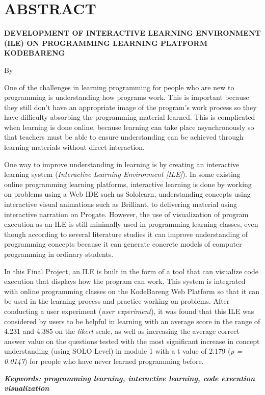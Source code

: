\clearpage
\chapter*{ABSTRACT}

\begin{center}
  \center
  \begin{singlespace}
    \bfseries \MakeUppercase{Development of Interactive Learning Environment (ILE) on Programming Learning Platform KodeBareng}

    \normalfont\normalsize
    By

    \bfseries \theauthor
  \end{singlespace}
\end{center}


\begin{singlespace}
  One of the challenges in learning programming for people who are new to programming is understanding how programs work. This is important because they still don't have an appropriate image of the program's work process so they have difficulty absorbing the programming material learned. This is complicated when learning is done online, because learning can take place asynchronously so that teachers must be able to ensure understanding can be achieved through learning materials without direct interaction.

  One way to improve understanding in learning is by creating an interactive learning system (\textit{Interactive Learning Environment [ILE]}). In some existing online programming learning platforms, interactive learning is done by working on problems using a Web IDE such as Sololearn, understanding concepts using interactive visual animations such as Brilliant, to delivering material using interactive narration on Progate. However, the use of visualization of program execution as an ILE is still minimally used in programming learning classes, even though according to several literature studies it can improve understanding of programming concepts because it can generate concrete models of computer programming in ordinary students.

  In this Final Project, an ILE is built in the form of a tool that can visualize code execution that displays how the program can work. This system is integrated with online programming classes on the KodeBareng Web Platform so that it can be used in the learning process and practice working on problems. After conducting a user experiment (\textit{user experiment}), it was found that this ILE was considered by users to be helpful in learning with an average score in the range of 4.231 and 4.385 on the \textit{likert} scale, as well as increasing the average correct answer value on the questions tested with the most significant increase in concept understanding (using SOLO Level) in module 1 with a t value of 2.179 (\textit{p = 0.0147}) for people who have never learned programming before.

  \textbf{\textit{Keywords: programming learning, interactive learning, code execution visualization}}
\end{singlespace}
\clearpage
